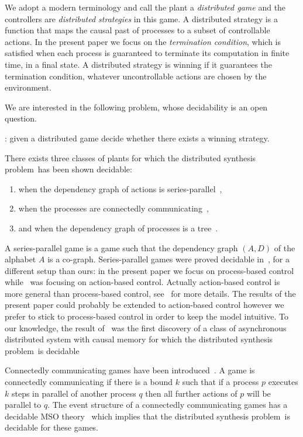 \documentclass[a4paper,UKenglish]{lipics-v2016}
\begin{document}
\medskip

We adopt a modern terminology and call the plant a \emph{distributed game} and the controllers are \emph{distributed strategies} in this game.
A distributed strategy is a function that maps the causal past of processes
to a subset of controllable actions.
In the present paper we focus on the \emph{termination condition},
which is satisfied when each process is guaranteed to terminate its computation in finite time,  in a final state.
A distributed strategy is winning if it guarantees the termination condition,
whatever uncontrollable actions are chosen by the environment.


We are interested in the following problem, whose decidability is an open question.
\smallskip
\newcommand{\dsp}{{\sc distributed synthesis problem}}

\noindent \dsp: given a distributed game decide
whether  there exists a winning strategy.

\smallskip

There exists three classes of plants for which the \dsp\ 
has been shown decidable:
\begin{enumerate}
\item
when the dependency graph of actions is series-parallel~\cite{gastin}, 
\item
when the processes are connectedly communicating~\cite{madhu},
\item
 and when the dependency graph of processes is a tree~\cite{acyclic,DBLP:conf/fsttcs/MuschollW14}. 
\end{enumerate}

A series-parallel game is a game such that
the dependency graph $(A,D)$ of the alphabet $A$
is a co-graph.
Series-parallel games were proved decidable in~\cite{gastin}, for a different setup than ours:
in the present paper we focus on process-based control while~\cite{gastin} was focusing
on action-based control. Actually action-based control is more general than process-based
control, see~\cite{alook} for more details. The results of the present paper could probably be extended to action-based control however we prefer to stick to process-based control in order to keep the model intuitive.
To our knowledge, the result of~\cite{gastin} was the first discovery of a class of asynchronous distributed system with causal memory for which the \dsp\ is decidable

Connectedly communicating games have been introduced~\cite{madhu}.
A game is connectedly communicating if there is a bound $k$ such that if a process $p$ executes $k$ steps in parallel of another process $q$ then all further actions of $p$ will be parallel to $q$.
The event structure of a 
connectedly communicating games has a decidable MSO theory~\cite{madhu}
which implies that the \dsp\ is decidable for these games.
\end{document}
